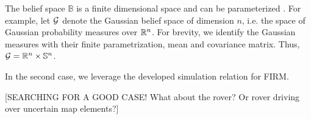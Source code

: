 \documentclass{ifacconf}
\newcommand{\red}[1]{{\color{red} #1}}
\renewcommand{\S}{\mathbb S}
\begin{document}
 
The belief space $\mathbb{B}$ is  a finite dimensional space and can be parameterized . For example, let $\mathcal{G}$ denote the Gaussian belief space
    of dimension $n$, i.e. the space of Gaussian
    probability measures over $\mathbb{R}^n$.
    For brevity, we identify the Gaussian measures
    with their finite parametrization, mean and
    covariance matrix.
     Thus,
    $\CA{G} =  \BB{R}^n \times  \S^n$.
    
    
 
 In the second case, we leverage the developed simulation relation for FIRM. 
 
 \red{[SEARCHING FOR A GOOD CASE! What about the rover? Or rover driving over uncertain map elements?]}





\end{document}

